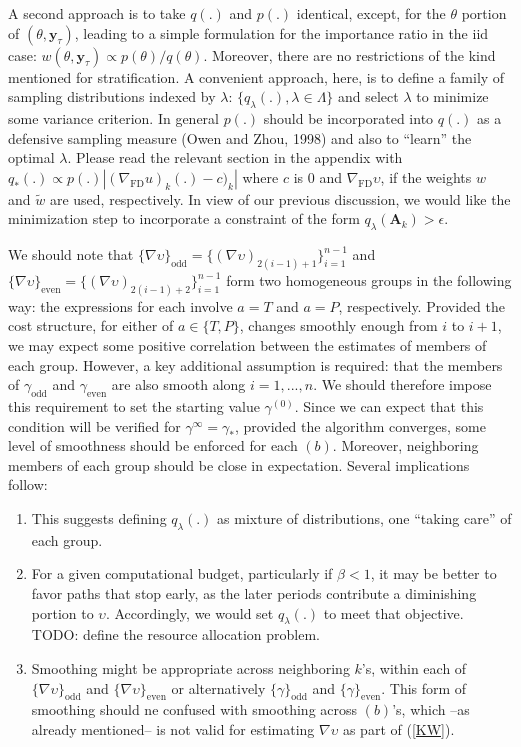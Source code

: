 \documentclass[11pt]{article}
\begin{document}
A second approach is to take $q(.)$ and $p(.)$ identical, except,
for the $\theta$ portion of $(\theta,\mathbf{y}_{\tau})$, leading to
a simple formulation for the importance ratio in the iid case:
$w(\theta,\mathbf{y}_\tau)\propto p(\theta)/q(\theta)$. Moreover,
there are no restrictions of the kind mentioned for stratification.
A convenient approach, here, is to define a family of sampling
distributions indexed by $\lambda$: $\{q_{\lambda}(.),\lambda\in
\Lambda\}$ and select $\lambda$ to minimize some variance criterion.
In general $p(.)$ should be incorporated into $q(.)$ as a defensive
sampling measure (Owen and Zhou, 1998) and also to ``learn'' the
optimal $\lambda$. Please read the relevant section in the appendix
with $q_*(.)\propto p(.) |(\nabla_{\mathrm{\scriptscriptstyle FD}}
u)_k(.)-c)_k|$ where $c$ is $0$ and
$\nabla_{\mathrm{\scriptscriptstyle FD}} \upsilon$, if the weights
$w$ and $\tilde w$ are used, respectively. In view of our previous
discussion, we would like the minimization step to incorporate a
constraint of the form $q_{\lambda}(\mathbf{A}_k)>\epsilon$.

We should note that $\{\nabla \upsilon\}_{\mathrm{odd}}=\{(\nabla
\upsilon)_{2(i-1)+1}\}_{i=1}^{n-1}$ and $\{\nabla
\upsilon\}_{\mathrm{even}}=\{(\nabla
\upsilon)_{2(i-1)+2}\}_{i=1}^{n-1}$ form two homogeneous groups in
the following way: the expressions for each involve $a=T$ and $a=P$,
respectively. Provided the cost structure, for either of
$a\in\{T,P\}$, changes smoothly enough from $i$ to $i+1$, we may
expect some positive correlation between the estimates of members of
each group. However, a key additional assumption is required: that
the members of $\gamma_{\mathrm{odd}}$ and $\gamma_{\mathrm{even}}$
are also smooth along $i=1,...,{n}$. We should therefore impose this
requirement to set the starting value $\gamma^{(0)}$. Since we can
expect that this condition will be verified for
$\gamma^{\infty}=\gamma_*$, provided the algorithm converges, some
level of smoothness should be enforced for each $(b)$. Moreover,
neighboring members of each group should be close in expectation.
Several implications follow:
\begin{enumerate}
\item This suggests defining $q_\lambda(.)$ as mixture of
distributions, one ``taking care'' of each group.
\item For a given computational budget, particularly if
$\beta<1$, it may be better to favor paths that stop early, as the
later periods contribute a diminishing portion to $\upsilon$.
Accordingly, we would set $q_{\lambda}(.)$ to meet that objective.
TODO: define the resource allocation problem.
\item Smoothing
might be appropriate across neighboring $k$'s, within each of
$\{\nabla \upsilon\}_{\mathrm{odd}}$ and $\{\nabla
\upsilon\}_{\mathrm{even}}$ or alternatively
$\{\gamma\}_{\mathrm{odd}}$ and $\{\gamma\}_{\mathrm{even}}$. This
form of smoothing should ne confused with smoothing across $(b)$'s,
which --as already mentioned-- is not valid for estimating $\nabla
\upsilon$ as part of (\ref{KW}).
\end{enumerate}
\end{document}
